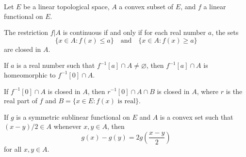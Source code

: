 Let $E$ be a linear topological space, $A$ a convex subset of $E$, and $f$ a linear functional on $E$.

 The restriction $f|A$ is continuous if and only if for each real number $a$, the sets
$$\{x \in A: f(x) \leq a\} \quad\text{and}\quad \{x \in A: f(x) \geq a\}$$
are closed in $A$.

 If $a$ is a real number such that $f^{-1}[a] \cap A \neq \varnothing$, then $f^{-1}[a] \cap A$ is homeomorphic to $f^{-1}[0] \cap A$.

 If $f^{-1}[0] \cap A$ is closed in $A$, then $r^{-1}[0] \cap A \cap B$ is closed in $A$, where $r$ is the real part of $f$ and $B = \{x \in E: f(x) \text{ is real}\}$.

 If $g$ is a symmetric sublinear functional on $E$ and $A$ is a convex set such that $(x - y)/2 \in A$ whenever $x, y \in A$, then
$$g(x) - g(y) = 2g\!\left(\frac{x - y}{2}\right)$$
for all $x, y \in A$.
